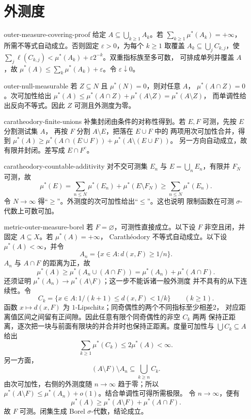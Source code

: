 \chapter{外测度}

\begin{solution}{outer-measure-covering-proof}
给定 $A\subseteq\bigcup_{k\ge1}A_k$。若 $\sum_{k\ge1}\mu^*(A_k)=+\infty$，
所需不等式自动成立。否则固定 $\varepsilon>0$，为每个 $k\ge1$ 取覆盖
$A_k\subseteq\bigcup_jC_{k,j}$，使
$\sum_j\ell(C_{k,j})<\mu^*(A_k)+\varepsilon2^{-k}$。双重指标族至多可数，
可排成单列并覆盖 $A$，故
$\mu^*(A)\le\sum_k\mu^*(A_k)+\varepsilon$。令 $\varepsilon\downarrow0$。
\end{solution}

\begin{solution}{outer-null-measurable}
若 $Z\subseteq N$ 且 $\mu^*(N)=0$，则对任意 $A$，
$\mu^*(A\cap Z)=0$。次可加性给出
$\mu^*(A)\le\mu^*(A\cap Z)+\mu^*(A\setminus Z)=\mu^*(A\setminus Z)$，
而单调性给出反向不等式。因此 $Z$ 可测且外测度为零。
\end{solution}

\begin{solution}{caratheodory-finite-unions}
补集封闭由条件的对称性得到。若 $E,F$ 可测，先按 $E$ 分割测试集 $A$，
再按 $F$ 分割 $A\setminus E$，把落在 $E\cup F$ 中的
两项用次可加性合并，得到
$\mu^*(A)\ge\mu^*(A\cap(E\cup F))+\mu^*(A\setminus(E\cup F))$。
另一方向自动成立，故有限并封闭。差写成 $E\cap F^c$。
\end{solution}

\begin{solution}{caratheodory-countable-additivity}
对不交可测集 $E_n$ 与 $E=\bigcup_nE_n$，有限并 $F_N$ 可测，故
\[
 \mu^*(E)=\sum_{n\le N}\mu^*(E_n)+\mu^*(E\setminus F_N)
 \ge\sum_{n\le N}\mu^*(E_n).
\]
令 $N\to\infty$ 得“$\ge$”。外测度的次可加性给出“$\le$”。这也说明
限制函数在可测 $\sigma$-代数上可数可加。
\end{solution}

\begin{solution}{metric-outer-measure-borel}
若 $F=\varnothing$，可测性直接成立。以下设 $F$ 非空且闭，并固定
$A\subseteq X$。若 $\mu^*(A)=+\infty$，
Carathéodory 不等式自动成立。以下设 $\mu^*(A)<\infty$，并令
\[
 A_n=\{x\in A:d(x,F)\ge 1/n\}.
\]
$A_n$ 与 $A\cap F$ 的距离为正，故
\[
 \mu^*(A)\ge\mu^*(A_n\cup(A\cap F))
 =\mu^*(A_n)+\mu^*(A\cap F).
\]
还须证明 $\mu^*(A_n)\to\mu^*(A\setminus F)$；这一步不能诉诸一般外测度
并不具有的从下连续性。令
\[
 C_k=\{x\in A:1/(k+1)\le d(x,F)<1/k\}\qquad(k\ge1).
\]
函数 $x\mapsto d(x,F)$ 为 $1$-Lipschitz；同奇偶性的两个不同指标至少相差2，
对应距离值区间之间留有正间隙。因此任意有限个同奇偶性的非空 $C_k$ 两两
保持正距离，逐次把一块与前面有限块的并合并时也保持正距离。度量可加性与
$\bigcup C_k\subseteq A$ 给出
\[
 \sum_{k\ge1}\mu^*(C_k)\le 2\mu^*(A)<\infty.
\]
另一方面，
\[
 (A\setminus F)\setminus A_n\subseteq\bigcup_{k\ge n}C_k.
\]
由次可加性，右侧的外测度随 $n\to\infty$ 趋于零；所以
$\mu^*(A\setminus F)\le\mu^*(A_n)+o(1)$。结合单调性可得所需极限。
令 $n\to\infty$，便有
\[
 \mu^*(A)\ge\mu^*(A\setminus F)+\mu^*(A\cap F).
\]
故 $F$ 可测。闭集生成 Borel $\sigma$-代数，结论成立。
\end{solution}

